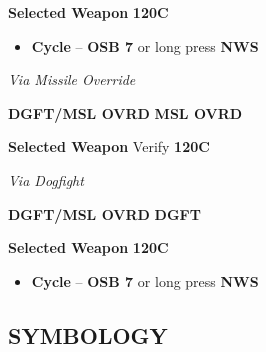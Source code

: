\begin{tableitemize}
{    \begin{subenumerate}
        \item \textbf{Selected Weapon} \dotfill \textbf{120C}
        \begin{itemize}
            \item \textbf{Cycle} -- \textbf{OSB 7} or long press \textbf{NWS}
        \end{itemize}
    \end{subenumerate}

    \emph{Via Missile Override}

    \begin{subenumerate}
        \item \textbf{DGFT/MSL OVRD} \dotfill \textbf{MSL OVRD}
        \item \textbf{Selected Weapon} \dotfill Verify \textbf{120C} 
    \end{subenumerate}
    
    \emph{Via Dogfight}

    \begin{subenumerate}
        \item \textbf{DGFT/MSL OVRD} \dotfill \textbf{DGFT}
        \item \textbf{Selected Weapon} \dotfill \textbf{120C}
        \begin{itemize}
            \item \textbf{Cycle} -- \textbf{OSB 7} or long press \textbf{NWS}
        \end{itemize}
    \end{subenumerate}}
\end{tableitemize}

\clearpage

\subsection{SYMBOLOGY}
\begin{tableitemize}
\end{tableitemize}

\clearpage

